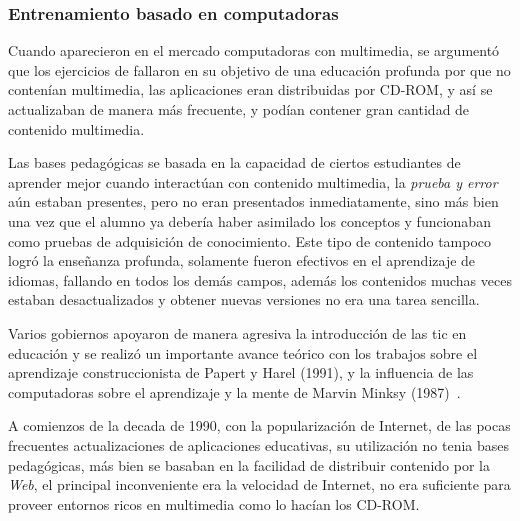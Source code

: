 \subsubsection{Entrenamiento basado en computadoras}

Cuando aparecieron en el mercado computadoras con multimedia, se argumentó que
los ejercicios de  fallaron en su objetivo de
una educación profunda por que no contenían multimedia\cite{leinonen:ict}, las
aplicaciones eran distribuidas por CD-ROM, y así se actualizaban de manera más
frecuente, y podían contener gran cantidad de contenido multimedia.

Las bases pedagógicas  se basada en la capacidad de ciertos
estudiantes de aprender mejor cuando interactúan con contenido multimedia, la
\emph{prueba y error} aún estaban presentes, pero no eran presentados
inmediatamente, sino más bien una vez que el alumno ya debería haber asimilado
los conceptos y funcionaban como pruebas de adquisición de conocimiento. Este
tipo de contenido tampoco logró la enseñanza profunda, solamente fueron
efectivos en el aprendizaje de idiomas, fallando en todos los demás
campos\cite{leinonen:ict}, además los contenidos muchas veces estaban
desactualizados y obtener nuevas versiones no era una tarea sencilla.

Varios gobiernos apoyaron de manera agresiva la introducción de las \Gls{tic} en
educación\cite{mcdougall2006theory} y se realizó un importante avance teórico
con los trabajos sobre el aprendizaje construccionista de Papert y Harel (1991),
y la influencia de las computadoras sobre el aprendizaje y la mente de Marvin
Minksy (1987)~\cite{mcdougall2006theory}.


A comienzos de la decada de 1990, con la popularización de Internet,  de las pocas frecuentes actualizaciones de
aplicaciones educativas, su utilización no tenia bases pedagógicas, más bien se
basaban en la facilidad de distribuir contenido por la \emph{Web}, el principal
inconveniente era la velocidad de Internet, no era suficiente para proveer
entornos ricos en multimedia como lo hacían los CD-ROM\cite{leinonen:ict}.

